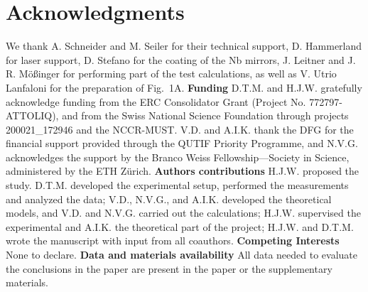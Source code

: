 \documentclass[12pt]{article}
\begin{document}
\section*{Acknowledgments}
We thank A. Schneider and M. Seiler for their technical support, D. Hammerland for laser support, D. Stefano for the coating of the Nb mirrors, J. Leitner and J. R. M\"o\ss{}inger for performing part of the test calculations, as well as V. Utrio Lanfaloni for the preparation of Fig.~1A. 
{\bf Funding} D.T.M. and H.J.W. gratefully acknowledge funding from the ERC Consolidator Grant (Project No. 772797-ATTOLIQ), and from the Swiss National Science Foundation through projects 200021\_172946 and the NCCR-MUST. V.D. and A.I.K. thank the DFG for the financial support provided through the QUTIF Priority Programme, and N.V.G. acknowledges the support by the Branco Weiss Fellowship---Society in Science, administered by the ETH Z\"urich.
{\bf Authors contributions} H.J.W. proposed the study. D.T.M. developed the experimental setup, performed the measurements and analyzed the data; V.D., N.V.G., and A.I.K. developed the theoretical models, and V.D. and N.V.G. carried out the calculations; H.J.W. supervised the experimental and A.I.K. the theoretical part of the project; H.J.W. and D.T.M. wrote the manuscript with input from all coauthors.
{\bf Competing Interests} None to declare.
{\bf Data and materials availability} All data needed to evaluate the conclusions in the paper are present in the paper or the supplementary materials.

\end{document}

